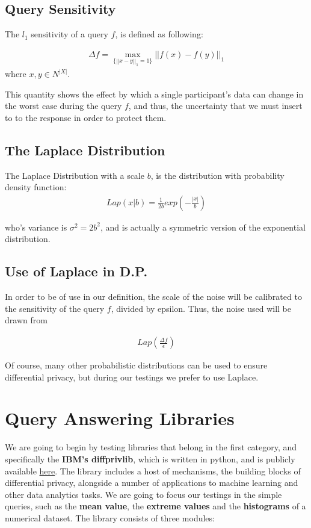 \subsection{Query Sensitivity}
The $l_1$ sensitivity of a query $f$, is defined as following:

\begin{align*}
    \Delta f = \max_{\{||x-y||_1 = 1\}} ||f(x) - f(y)||_1
\end{align*} where $x,y \in N^{|X|}$.

This quantity shows the effect by which a single participant's data can change in the worst case during the query $f$, and thus, the uncertainty that we must insert to to the response in order to protect them.

\subsection{The Laplace Distribution}
The Laplace Distribution with a scale $b$, is the distribution with probability density function: 
\begin{align*}
Lap(x|b) = \frac{1}{2b}exp(-\frac{|x|}{b})
\end{align*}

who's variance is $\sigma^2 = 2b^2$, and is actually a symmetric version of the exponential distribution.

\subsection{Use of Laplace in D.P.}

In order to be of use in our definition, the scale of the noise will be calibrated to the sensitivity of the query $f$, divided by epsilon. Thus, the noise used will be drawn from

\begin{align*}
Lap(\frac{\Delta f}{\epsilon})
\end{align*}

Of course, many other probabilistic distributions can be used to ensure differential privacy, but during our testings we prefer to use Laplace.

\section{Query Answering Libraries}

We are going to begin by testing libraries that belong in the first category, and specifically the \textbf{IBM's diffprivlib}, which is written in python, and is publicly available \href{https://github.com/IBM/differential-privacy-library}{here}. The library includes a host of mechanisms, the building blocks of differential privacy, alongside a number of applications to machine learning and other data analytics tasks. We are going to focus our testings in the simple queries, such as the \textbf{mean value}, the \textbf{extreme values} and the \textbf{histograms} of a numerical dataset. The library consists of three modules:

